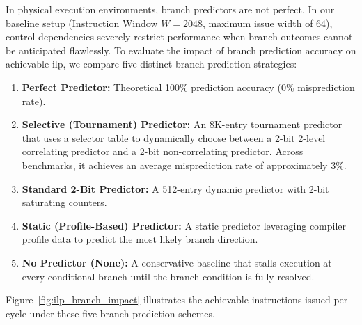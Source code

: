 In physical execution environments, branch predictors are not perfect. In our baseline setup (Instruction Window $W = 2048$, maximum issue width of 64), control dependencies severely restrict performance when branch outcomes cannot be anticipated flawlessly. To evaluate the impact of branch prediction accuracy on achievable \gls{ilp}, we compare five distinct branch prediction strategies:
\begin{enumerate}
    \item \textbf{Perfect Predictor:} Theoretical 100\% prediction accuracy (0\% misprediction rate).
    \item \textbf{Selective (Tournament) Predictor:} An 8K-entry tournament predictor that uses a selector table to dynamically choose between a 2-bit 2-level correlating predictor and a 2-bit non-correlating predictor. Across benchmarks, it achieves an average misprediction rate of approximately 3\%.
    \item \textbf{Standard 2-Bit Predictor:} A 512-entry dynamic predictor with 2-bit saturating counters.
    \item \textbf{Static (Profile-Based) Predictor:} A static predictor leveraging compiler profile data to predict the most likely branch direction.
    \item \textbf{No Predictor (None):} A conservative baseline that stalls execution at every conditional branch until the branch condition is fully resolved.
\end{enumerate}

Figure~\ref{fig:ilp_branch_impact} illustrates the achievable instructions issued per cycle under these five branch prediction schemes.

